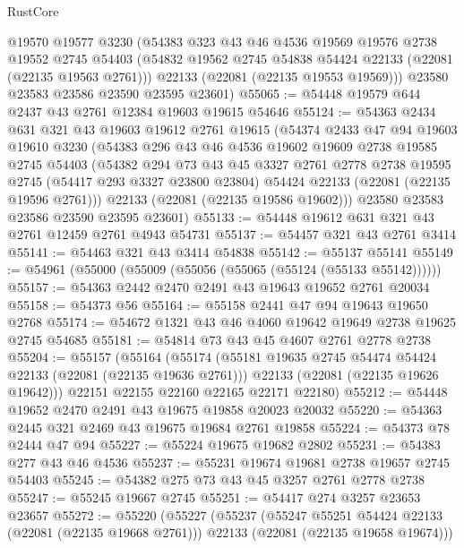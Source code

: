 \begin{lexlean}{RustCore}
\begin{coremodule}
      @19570
      @19577
      @3230
      (@54383
        @323
        @43
        @46
        @4536
        @19569
        @19576
        @2738
        @19552
        @2745
        @54403
        (@54832 @19562 @2745 @54838 @54424 @22133 (@22081 (@22135 @19563 @2761)))
        @22133
        (@22081 (@22135 @19553 @19569)))
      @23580
      @23583
      @23586
      @23590
      @23595
      @23601)
@55065 := @54448 @19579 @644 @2437 @43 @2761 @12384 @19603 @19615 @54646
@55124 := @54363
    @2434
    @631
    @321
    @43
    @19603
    @19612
    @2761
    @19615
    (@54374
      @2433
      @47
      @94
      @19603
      @19610
      @3230
      (@54383
        @296
        @43
        @46
        @4536
        @19602
        @19609
        @2738
        @19585
        @2745
        @54403
        (@54382
          @294
          @73
          @43
          @45
          @3327
          @2761
          @2778
          @2738
          @19595
          @2745
          (@54417 @293 @3327 @23800 @23804)
          @54424
          @22133
          (@22081 (@22135 @19596 @2761)))
        @22133
        (@22081 (@22135 @19586 @19602)))
      @23580
      @23583
      @23586
      @23590
      @23595
      @23601)
@55133 := @54448 @19612 @631 @321 @43 @2761 @12459 @2761 @4943 @54731
@55137 := @54457 @321 @43 @2761 @3414
@55141 := @54463 @321 @43 @3414 @54838
@55142 := @55137 @55141
@55149 := @54961 (@55000 (@55009 (@55056 (@55065 (@55124 (@55133 @55142))))))
@55157 := @54363 @2442 @2470 @2491 @43 @19643 @19652 @2761 @20034
@55158 := @54373 @56
@55164 := @55158 @2441 @47 @94 @19643 @19650 @2768
@55174 := @54672 @1321 @43 @46 @4060 @19642 @19649 @2738 @19625 @2745 @54685
@55181 := @54814 @73 @43 @45 @4607 @2761 @2778 @2738
@55204 := @55157
    (@55164
      (@55174
        (@55181 @19635 @2745 @54474 @54424 @22133 (@22081 (@22135 @19636 @2761)))
        @22133
        (@22081 (@22135 @19626 @19642)))
      @22151
      @22155
      @22160
      @22165
      @22171
      @22180)
@55212 := @54448 @19652 @2470 @2491 @43 @19675 @19858 @20023 @20032
@55220 := @54363 @2445 @321 @2469 @43 @19675 @19684 @2761 @19858
@55224 := @54373 @78 @2444 @47 @94
@55227 := @55224 @19675 @19682 @2802
@55231 := @54383 @277 @43 @46 @4536
@55237 := @55231 @19674 @19681 @2738 @19657 @2745 @54403
@55245 := @54382 @275 @73 @43 @45 @3257 @2761 @2778 @2738
@55247 := @55245 @19667 @2745
@55251 := @54417 @274 @3257 @23653 @23657
@55272 := @55220
    (@55227
      (@55237
        (@55247 @55251 @54424 @22133 (@22081 (@22135 @19668 @2761)))
        @22133
        (@22081 (@22135 @19658 @19674)))

\end{coremodule}
\end{lexlean}
